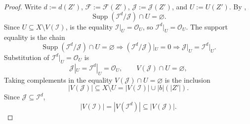 \begin{proof}
  Write $d:=d(Z')$, $\mathcal F:=\mathcal F(Z')$,
  $\mathcal J:=\mathcal J(Z')$, and $U:=U(Z')$.  By
  ,
  \[
    \operatorname{Supp}(\mathcal I^d/\mathcal J)\cap U=\varnothing.
  \]
  Since $U\subseteq X\setminus V(\mathcal I)$,
   is the equality
  $\mathcal I|_U=\mathcal O_U$, so
  $\mathcal I^d|_U=\mathcal O_U$.  The support equality is the chain
  \[
    \operatorname{Supp}(\mathcal I^d/\mathcal J)\cap U=\varnothing
      \Longrightarrow
    (\mathcal I^d/\mathcal J)|_U=0
      \Longrightarrow
    \mathcal J|_U=\mathcal I^d|_U.
  \]
  Substitution of $\mathcal I^d|_U=\mathcal O_U$ is
  \[
    \mathcal J|_U=\mathcal I^d|_U=\mathcal O_U,
    \qquad
    V(\mathcal J)\cap U=\varnothing,
  \]
  Taking complements in the equality
  $V(\mathcal J)\cap U=\varnothing$ is the inclusion
  \[
    |V(\mathcal J)|\subseteq X\setminus U
      =|V(\mathcal I)|\cup |b|(|Z'|).
  \]
  Since $\mathcal J\subseteq\mathcal I^d$,
  \[
    |V(\mathcal I)|=|V(\mathcal I^d)|
      \subseteq|V(\mathcal J)|.
  \]


\end{proof}
